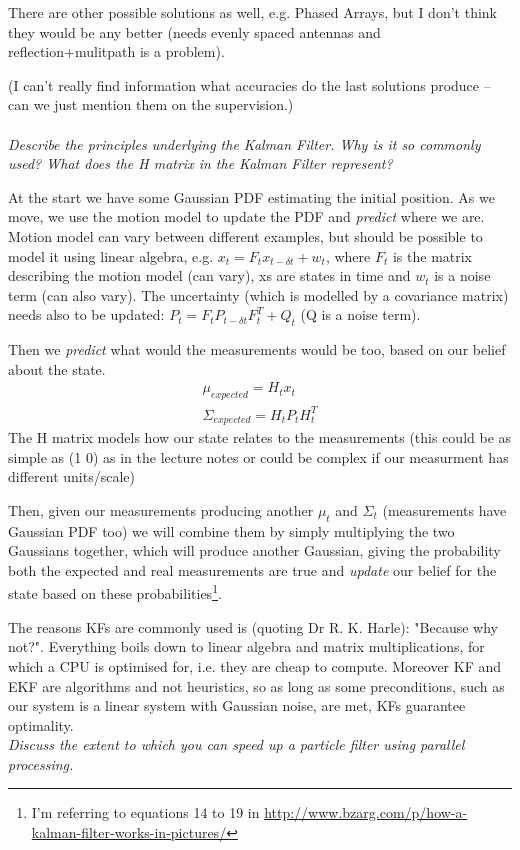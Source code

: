 \documentclass[12pt]{article}
\newcommand*\circled[1]{\tikz[baseline=(char.base)]{
		\node[shape=circle,draw,inner sep=0pt] (char) {#1};}}
\begin{document}
There are other possible solutions as well, e.g. Phased Arrays, but I don't
think they would be any better (needs evenly spaced antennas and
reflection+mulitpath is a problem).

(I can't really find information what accuracies do the last solutions produce
-- can we just mention them on the supervision.)
\\
\\
\textit{\circled{9.} Describe the principles underlying the Kalman Filter. Why
is it so commonly used? What does the H matrix in the Kalman Filter
represent?} 

At the start we have some Gaussian PDF estimating the initial position. As we
move, we use the motion model to update the PDF and \textit{predict} where we
are. Motion model can vary between different examples, but should be possible
to model it using linear algebra, e.g. $x_t = F_tx_{t-\delta t} + w_t$, where
$F_t$ is the matrix describing the motion model (can vary), xs are states in
time and $w_t$ is a noise term (can also vary).  The uncertainty (which is
modelled by a covariance matrix) needs also to be updated: $P_t
= F_tP_{t-\delta t}F^T_t+Q_t$ (Q is a noise term).

Then we \textit{predict} what would the measurements would be too, based on our belief about the
state.
\begin{gather*}
    \mu_{expected}=H_tx_t
    \\
    \Sigma_{expected}=H_tP_tH^T_t
\end{gather*}
The H matrix models how our state relates to the measurements (this could be as
simple as (1 0) as in the lecture notes or could be complex if our measurment
has different units/scale)

Then, given our measurements producing another $\mu_t$ and $\Sigma_t$
(measurements have Gaussian PDF too) we will combine them by simply multiplying
the two Gaussians together, which will produce another Gaussian, giving the
probability both the expected and real measurements are true and
\textit{update} our belief for the state based on these
probabilities\footnote{I'm referring to equations 14 to 19 in
\url{http://www.bzarg.com/p/how-a-kalman-filter-works-in-pictures/}}.

The reasons KFs are commonly used is (quoting Dr R. K. Harle): "Because why
not?". Everything boils down to linear algebra and matrix multiplications, for
which a CPU is optimised for, i.e. they are cheap to compute. Moreover KF and
EKF are algorithms and not heuristics, so as long as some preconditions, such
as our system is a linear system with Gaussian noise, are met, KFs guarantee
optimality.
\\
\textit{\circled{10.} Discuss the extent to which you can speed up a particle filter using parallel processing.}
\end{document}

